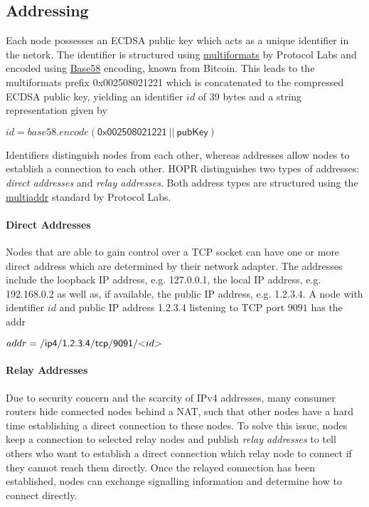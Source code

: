 \subsection{Addressing}
\label{sec:p2p:addressing}

Each node possesses an ECDSA public key which acts as a unique identifier in the netork. The identifier is structured using \href{https://github.com/multiformats/multiformats}{multiformats} by Protocol Labs and encoded using \href{https://en.bitcoin.it/wiki/Base58Check_encoding}{Base58} encoding, known from Bitcoin. This leads to the multiformats prefix \textsf{0x002508021221} which is concatenated to the compressed ECDSA public key, yielding an identifier $id$ of 39 bytes and a string representation given by

\begin{center}
    $id = base58.encode(\mathsf{0x002508021221} \ || \ \mathsf{pubKey})$
\end{center}

Identifiers distinguish nodes from each other, whereas addresses allow nodes to establish a connection to each other. HOPR distinguishes two types of addresses: \textit{direct addresses} and \textit{relay addresses}. Both address types are structured using the \href{https://github.com/multiformats/multiaddr}{multiaddr} standard by Protocol Labs.

\paragraph{Direct Addresses}

Nodes that are able to gain control over a TCP socket can have one or more direct address which are determined by their network adapter. The addresses include the loopback IP address, e.g. \textsf{127.0.0.1}, the local IP address, e.g. \textsf{192.168.0.2} as well as, if available, the public IP address, e.g. \textsf{1.2.3.4}. A node with identifier $id$ and public IP address \textsf{1.2.3.4} listening to TCP port $9091$ has the addr

\begin{center}
    $addr = \mathsf{/ip4/1.2.3.4/tcp/9091/}\text{\textless$id$\textgreater{}}$
\end{center}

\paragraph{Relay Addresses}

Due to security concern and the scarcity of IPv4 addresses, many consumer routers hide connected nodes behind a NAT, such that other nodes have a hard time establishing a direct connection to these nodes. To solve this issue, nodes keep a connection to selected relay nodes and publish \textit{relay addresses} to tell others who want to establish a direct connection which relay node to connect if they cannot reach them directly. Once the relayed connection has been established, nodes can exchange signalling information and determine how to connect directly.

